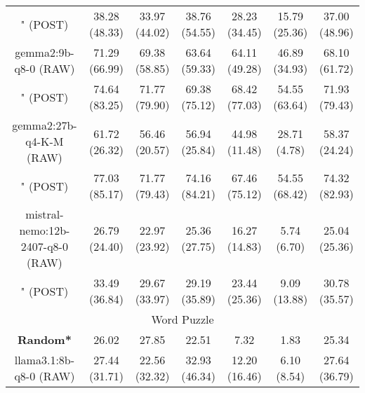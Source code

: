 \begin{table}[]
{\begin{tabular}{ccccccc}
        

        \multicolumn{1}{c|}{" (POST)} & 38.28 (48.33) & 33.97 (44.02) & \multicolumn{1}{c|}{38.76 (54.55)} & 28.23 (34.45) & \multicolumn{1}{c|}{15.79 (25.36)} & 37.00 (48.96) \\
        \cline{1-7}
        

        \multicolumn{1}{c|}{gemma2:9b-q8-0 (RAW)} & 71.29 (66.99) & 69.38 (58.85) & \multicolumn{1}{c|}{63.64 (59.33)} & 64.11 (49.28) & \multicolumn{1}{c|}{46.89 (34.93)} & 68.10 (61.72) \\
        
        

        \multicolumn{1}{c|}{" (POST)} & 74.64 (83.25) & 71.77 (79.90) & \multicolumn{1}{c|}{69.38 (75.12)} & 68.42 (77.03) & \multicolumn{1}{c|}{54.55 (63.64)} & 71.93 (79.43) \\
        \cline{1-7}
        

        \multicolumn{1}{c|}{gemma2:27b-q4-K-M (RAW)} & 61.72 (26.32) & 56.46 (20.57) & \multicolumn{1}{c|}{56.94 (25.84)} & 44.98 (11.48) & \multicolumn{1}{c|}{28.71 (4.78)} & 58.37 (24.24) \\
        
        

        \multicolumn{1}{c|}{" (POST)} & 77.03 (85.17) & 71.77 (79.43) & \multicolumn{1}{c|}{74.16 (84.21)} & 67.46 (75.12) & \multicolumn{1}{c|}{54.55 (68.42)} & 74.32 (82.93) \\
        \cline{1-7}
        

        \multicolumn{1}{c|}{mistral-nemo:12b-2407-q8-0 (RAW)} & 26.79 (24.40) & 22.97 (23.92) & \multicolumn{1}{c|}{25.36 (27.75)} & 16.27 (14.83) & \multicolumn{1}{c|}{5.74 (6.70)} & 25.04 (25.36) \\
        
        

        \multicolumn{1}{c|}{" (POST)} & 33.49 (36.84) & 29.67 (33.97) & \multicolumn{1}{c|}{29.19 (35.89)} & 23.44 (25.36) & \multicolumn{1}{c|}{9.09 (13.88)} & 30.78 (35.57) \\
        \cline{1-7}
        
\hline
\multicolumn{7}{c}{Word Puzzle} \\ \hline
\multicolumn{1}{c|}{\textbf{Random*}} & 26.02 & 27.85 & \multicolumn{1}{c|}{22.51} & 7.32 & \multicolumn{1}{c|}{1.83} & 25.34 \\ \hline

        \multicolumn{1}{c|}{llama3.1:8b-q8-0 (RAW)} & 27.44 (31.71) & 22.56 (32.32) & \multicolumn{1}{c|}{32.93 (46.34)} & 12.20 (16.46) & \multicolumn{1}{c|}{6.10 (8.54)} & 27.64 (36.79) \\
        

\end{tabular}}
\end{table}
